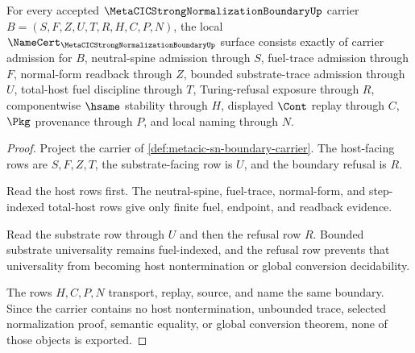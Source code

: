 \begin{theorem}
\label{thm:metacic-sn-boundary-namecert-obligations}
For every accepted $\MetaCICStrongNormalizationBoundaryUp$ carrier $B=(S,F,Z,U,T,R,H,C,P,N)$, the local $\NameCert_{\MetaCICStrongNormalizationBoundaryUp}$ surface consists exactly of carrier admission for $B$, neutral-spine admission through $S$, fuel-trace admission through $F$, normal-form readback through $Z$, bounded substrate-trace admission through $U$, total-host fuel discipline through $T$, Turing-refusal exposure through $R$, componentwise $\hsame$ stability through $H$, displayed $\Cont$ replay through $C$, $\Pkg$ provenance through $P$, and local naming through $N$.
\end{theorem}
\begin{proof}
Project the carrier of \autoref{def:metacic-sn-boundary-carrier}. The host-facing rows are $S,F,Z,T$, the substrate-facing row is $U$, and the boundary refusal is $R$.

Read the host rows first. The neutral-spine, fuel-trace, normal-form, and step-indexed total-host rows give only finite fuel, endpoint, and readback evidence.

Read the substrate row through $U$ and then the refusal row $R$. Bounded substrate universality remains fuel-indexed, and the refusal row prevents that universality from becoming host nontermination or global conversion decidability.

The rows $H,C,P,N$ transport, replay, source, and name the same boundary. Since the carrier contains no host nontermination, unbounded trace, selected normalization proof, semantic equality, or global conversion theorem, none of those objects is exported.
\end{proof}

